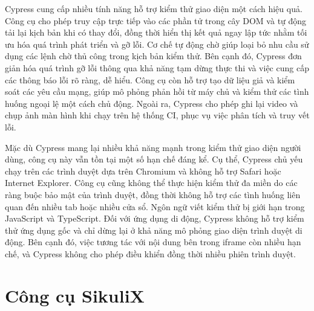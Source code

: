\documentclass[a4paper, 12pt]{report}
\begin{document}
Cypress cung cấp nhiều tính năng hỗ trợ kiểm thử giao diện một cách hiệu quả. Công cụ cho phép truy cập trực tiếp vào các phần tử trong cây DOM và tự động tải lại kịch bản khi có thay đổi, đồng thời hiển thị kết quả ngay lập tức nhằm tối ưu hóa quá trình phát triển và gỡ lỗi. Cơ chế tự động chờ giúp loại bỏ nhu cầu sử dụng các lệnh chờ thủ công trong kịch bản kiểm thử. Bên cạnh đó, Cypress đơn giản hóa quá trình gỡ lỗi thông qua khả năng tạm dừng thực thi và việc cung cấp các thông báo lỗi rõ ràng, dễ hiểu. Công cụ còn hỗ trợ tạo dữ liệu giả và kiểm soát các yêu cầu mạng, giúp mô phỏng phản hồi từ máy chủ và kiểm thử các tình huống ngoại lệ một cách chủ động. Ngoài ra, Cypress cho phép ghi lại video và chụp ảnh màn hình khi chạy trên hệ thống CI, phục vụ việc phân tích và truy vết lỗi.


Mặc dù Cypress mang lại nhiều khả năng mạnh trong kiểm thử giao diện người dùng, công cụ này vẫn tồn tại một số hạn chế đáng kể. Cụ thể, Cypress chủ yếu chạy trên các trình duyệt dựa trên Chromium và không hỗ trợ Safari hoặc Internet Explorer. Công cụ cũng không thể thực hiện kiểm thử đa miền do các ràng buộc bảo mật của trình duyệt, đồng thời không hỗ trợ các tình huống liên quan đến nhiều tab hoặc nhiều cửa sổ. Ngôn ngữ viết kiểm thử bị giới hạn trong JavaScript và TypeScript. Đối với ứng dụng di động, Cypress không hỗ trợ kiểm thử ứng dụng gốc và chỉ dừng lại ở khả năng mô phỏng giao diện trình duyệt di động. Bên cạnh đó, việc tương tác với nội dung bên trong iframe còn nhiều hạn chế, và Cypress không cho phép điều khiển đồng thời nhiều phiên trình duyệt.







\section{Công cụ SikuliX}
\end{document}
